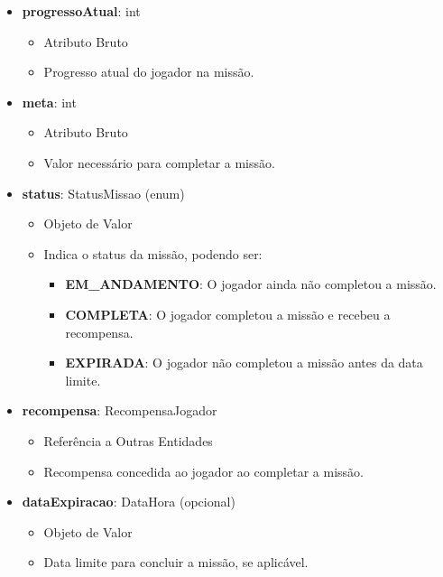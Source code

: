 \begin{itemize}
        \item \textbf{progressoAtual}: int  
              \begin{itemize}
                  \item Atributo Bruto
                  \item Progresso atual do jogador na missão.
              \end{itemize}
    
        \item \textbf{meta}: int  
              \begin{itemize}
                  \item Atributo Bruto
                  \item Valor necessário para completar a missão.
              \end{itemize}
    
        \item \textbf{status}: StatusMissao (enum)  
              \begin{itemize}
                  \item Objeto de Valor
                  \item Indica o status da missão, podendo ser:
                  \begin{itemize}
                      \item \textbf{EM\_ANDAMENTO}: O jogador ainda não completou a missão.
                      \item \textbf{COMPLETA}: O jogador completou a missão e recebeu a recompensa.
                      \item \textbf{EXPIRADA}: O jogador não completou a missão antes da data limite.
                  \end{itemize}
              \end{itemize}
    
        \item \textbf{recompensa}: RecompensaJogador  
              \begin{itemize}
                  \item Referência a Outras Entidades
                  \item Recompensa concedida ao jogador ao completar a missão.
              \end{itemize}
    
        \item \textbf{dataExpiracao}: DataHora (opcional)  
              \begin{itemize}
                  \item Objeto de Valor
                  \item Data limite para concluir a missão, se aplicável.
              \end{itemize}
    \end{itemize}
    

